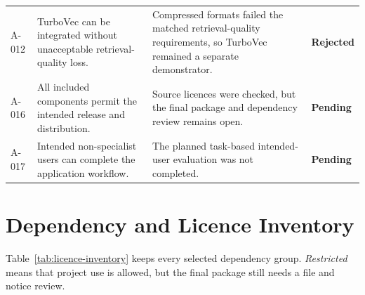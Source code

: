 \begin{longtable}{@{}P{0.09\dimexpr{}\tabcolsep\relax}P{0.30\dimexpr{}\tabcolsep\relax}P{0.47\dimexpr{}\tabcolsep\relax}P{0.14\dimexpr{}\tabcolsep\relax}@{}}
    A-012 & TurboVec can be integrated without unacceptable retrieval-quality loss. &
    Compressed formats failed the matched retrieval-quality requirements, so TurboVec
    remained a separate demonstrator. &
    \textbf{Rejected} \\

    A-016 & All included components permit the intended release and distribution. &
    Source licences were checked, but the final package and dependency review remains open. &
    \textbf{Pending} \\

    A-017 & Intended non-specialist users can complete the application workflow. &
    The planned task-based intended-user evaluation was not completed. &
    \textbf{Pending} \\
    \bottomrule
\end{longtable}
\endgroup

\section{Dependency and Licence Inventory}

Table~\ref{tab:licence-inventory} keeps every selected dependency group.
\emph{Restricted} means that project use is allowed, but the final package still
needs a file and notice review.

